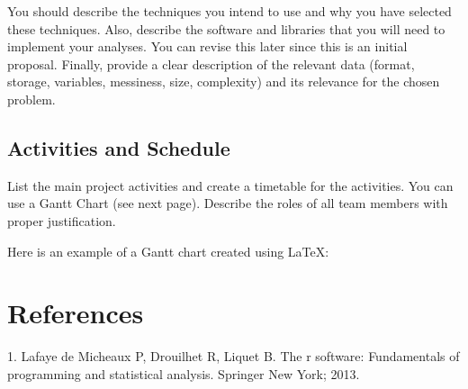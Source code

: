 \documentclass[mstat,12pt]{unswthesis}
\newenvironment{CSLReferences}%
  {}%
  {\par}
\begin{document}
You should describe the techniques you intend to use and why you have
selected these techniques. Also, describe the software and libraries
that you will need to implement your analyses. You can revise this later
since this is an initial proposal. Finally, provide a clear description
of the relevant data (format, storage, variables, messiness, size,
complexity) and its relevance for the chosen problem.

\hypertarget{activities-and-schedule}{%
\section{Activities and Schedule}\label{activities-and-schedule}}

List the main project activities and create a timetable for the
activities. You can use a Gantt Chart (see next page). Describe the
roles of all team members with proper justification.

\newpage

Here is an example of a Gantt chart created using \LaTeX:

\bigskip

\hypertarget{references}{%
\chapter*{References}\label{references}}




\hypertarget{refs}{}
\begin{CSLReferences}{0}{0}
\leavevmode{}%
1. Lafaye de Micheaux P, Drouilhet R, Liquet B. The r software:
Fundamentals of programming and statistical analysis. Springer New York;
2013.

\end{CSLReferences}
\end{document}
